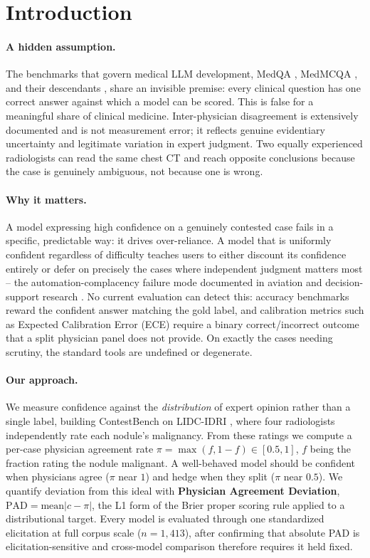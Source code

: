 \documentclass[letterpaper]{article} %
\begin{document}
\section{Introduction}

\paragraph{A hidden assumption.} The benchmarks that govern medical LLM
development, MedQA \citep{jin2021medqa}, MedMCQA \citep{pal2022medmcqa}, and
their descendants \citep{medrbench2025,medthinkbench2025,li2024mediq}, share
an invisible premise: every clinical question has one correct answer against
which a model can be scored. This is false for a meaningful share of
clinical medicine. Inter-physician disagreement is extensively documented
and is not measurement error; it reflects genuine evidentiary uncertainty and
legitimate variation in expert judgment. Two equally experienced
radiologists can read the same chest CT and reach opposite conclusions
because the case is genuinely ambiguous, not because one is wrong.

\paragraph{Why it matters.} A model expressing high confidence on a
genuinely contested case fails in a specific, predictable way: it drives
over-reliance. A model that is uniformly confident regardless of difficulty
teaches users to either discount its confidence entirely or defer on
precisely the cases where independent judgment matters most -- the
automation-complacency failure mode documented in aviation and
decision-support research \citep{parasuraman1997humans}. No current
evaluation can detect this: accuracy benchmarks reward the confident answer
matching the gold label, and calibration metrics such as Expected
Calibration Error (ECE) require a binary correct/incorrect outcome that a
split physician panel does not provide. On exactly the cases needing
scrutiny, the standard tools are undefined or degenerate.

\paragraph{Our approach.} We measure confidence against the
\emph{distribution} of expert opinion rather than a single label, building
ContestBench on LIDC-IDRI \citep{armato2011lidc}, where four radiologists
independently rate each nodule's malignancy. From these ratings we compute a
per-case physician agreement rate $\pi = \max(f, 1-f) \in [0.5,1]$, $f$ being
the fraction rating the nodule malignant. A well-behaved model should be
confident when physicians agree ($\pi$ near $1$) and hedge when they split
($\pi$ near $0.5$). We quantify deviation from this ideal with
\textbf{Physician Agreement Deviation}, $\mathrm{PAD} = \mathrm{mean}|c -
\pi|$, the L1 form of the Brier proper scoring rule
\citep{brier1950verification,gneiting2007strictly} applied to a
distributional target. Every model is evaluated through one standardized
elicitation at full corpus scale ($n{=}1{,}413$), after confirming that
absolute PAD is elicitation-sensitive and cross-model comparison therefore
requires it held fixed.
\end{document}
